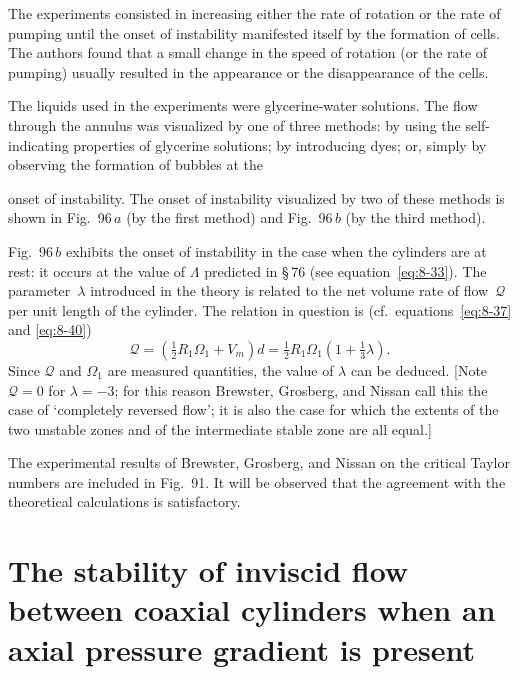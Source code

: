 The experiments consisted in increasing either the rate of rotation or the rate of pumping until the onset of instability manifested itself by the formation of cells. The authors found that a small change in the speed of rotation (or the rate of pumping) usually resulted in the appearance or the disappearance of the cells.

The liquids used in the experiments were glycerine-water solutions. The flow through the annulus was visualized by one of three methods: by using the self-indicating properties of glycerine solutions; by introducing dyes; or, simply by observing the formation of bubbles at the


onset of instability. The onset of instability visualized by two of these methods is shown in Fig.~96\,$a$ (by the first method) and Fig.~96\,$b$ (by the third method).

Fig.~96\,$b$ exhibits the onset of instability in the case when the cylinders are at rest: it occurs at the value of $\Lambda$ predicted in \S\,76 (see equation~\eqref{eq:8-33}). The parameter~$\lambda$ introduced in the theory is related to the net volume rate of flow~$\mathscr{Q}$ per unit length of the cylinder. The relation in question is (cf.\ equations~\eqref{eq:8-37} and \eqref{eq:8-40})
\begin{equation}
\label{eq:8-65}
\mathscr{Q} = (\tfrac{1}{2}R_1\Omega_1 + V_m)d = \tfrac{1}{2}R_1\Omega_1(1+\tfrac{1}{3}\lambda).
\end{equation}
Since $\mathscr{Q}$ and $\Omega_1$ are measured quantities, the value of $\lambda$ can be deduced. [Note $\mathscr{Q} = 0$ for $\lambda = -3$; for this reason Brewster, Grosberg, and Nissan call this the case of `completely reversed flow'; it is also the case for which the extents of the two unstable zones and of the intermediate stable zone are all equal.]

The experimental results of Brewster, Grosberg, and Nissan on the critical Taylor numbers are included in Fig.~91. It will be observed that the agreement with the theoretical calculations is satisfactory.

\section{The stability of inviscid flow between coaxial cylinders when an axial pressure gradient is present}
\label{sec:78}

